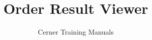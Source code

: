 

\title{Order Result Viewer} %
\author{Cerner Training Manuals}

\renewcommand{\maketitlepage}[0]{%
  \cleardoublepage%
  {%
  \pagestyle{plain}%
  \sffamily%
  \begin{fullwidth}%
  \fontsize{18}{20}\selectfont\par\noindent\textcolor{darkgray}{\allcaps{\thanklessauthor}}%
  \vspace{11.5pc}%
  \fontsize{30}{32}\selectfont\par\noindent\textcolor{darkgray}{\allcaps{\thanklesstitle}}%
  \vfill%
  \fontsize{14}{16}\selectfont\par\noindent\allcaps{\thanklesspublisher}%
  \end{fullwidth}%
  }
}


    \frontmatter
        \maketitle %
        \begin{fullwidth}
          \tableofcontents
        \end{fullwidth}

    \mainmatter
        

    \backmatter


